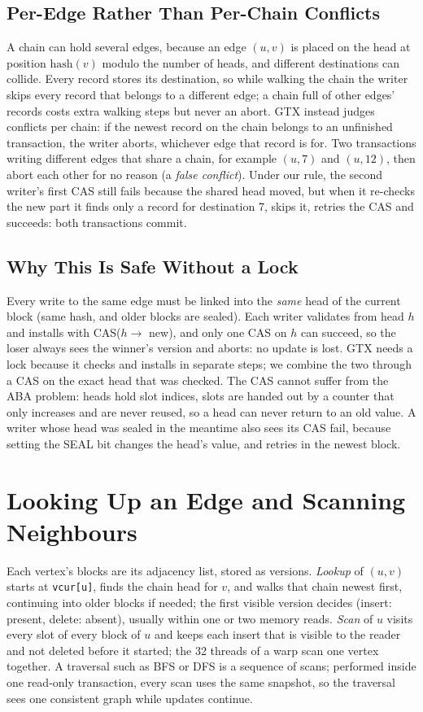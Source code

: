 \documentclass[11pt,a4paper,oneside]{report}
\newcommand{\code}[1]{\texttt{#1}}
\begin{document}
\subsection{Per-Edge Rather Than Per-Chain Conflicts}
A chain can hold several edges, because an edge $(u,v)$ is placed on the head at position $\mathrm{hash}(v)$ modulo the
number of heads, and different destinations can collide. Every record stores its destination, so while walking the
chain the writer skips every record that belongs to a different edge; a chain full of other edges' records costs extra
walking steps but never an abort. GTX instead judges conflicts per chain: if the newest record on the chain belongs to
an unfinished transaction, the writer aborts, whichever edge that record is for. Two transactions writing different
edges that share a chain, for example $(u,7)$ and $(u,12)$, then abort each other for no reason (a \emph{false
conflict}). Under our rule, the second writer's first CAS still fails because the shared head moved, but when it
re-checks the new part it finds only a record for destination 7, skips it, retries the CAS and succeeds: both
transactions commit.

\subsection{Why This Is Safe Without a Lock}
\label{sec:safe}
Every write to the same edge must be linked into the \emph{same} head of the current block (same hash, and older blocks
are sealed). Each writer validates from head $h$ and installs with CAS($h \rightarrow$ new), and only one CAS on $h$
can succeed, so the loser always sees the winner's version and aborts: no update is lost. GTX needs a lock because it
checks and installs in separate steps; we combine the two through a CAS on the exact head that was checked. The CAS
cannot suffer from the ABA problem: heads hold slot indices, slots are handed out by a counter that only increases and
are never reused, so a head can never return to an old value. A writer whose head was sealed in the meantime also sees
its CAS fail, because setting the SEAL bit changes the head's value, and retries in the newest block.

\section{Looking Up an Edge and Scanning Neighbours}
Each vertex's blocks are its adjacency list, stored as versions. \emph{Lookup} of $(u,v)$ starts at \code{vcur[u]},
finds the chain head for $v$, and walks that chain newest first, continuing into older blocks if needed; the first
visible version decides (insert: present, delete: absent), usually within one or two memory reads. \emph{Scan} of $u$
visits every slot of every block of $u$ and keeps each insert that is visible to the reader and not deleted before it
started; the 32 threads of a warp scan one vertex together. A traversal such as BFS or DFS is a sequence of scans;
performed inside one read-only transaction, every scan uses the same snapshot, so the traversal sees one consistent
graph while updates continue.
\end{document}
